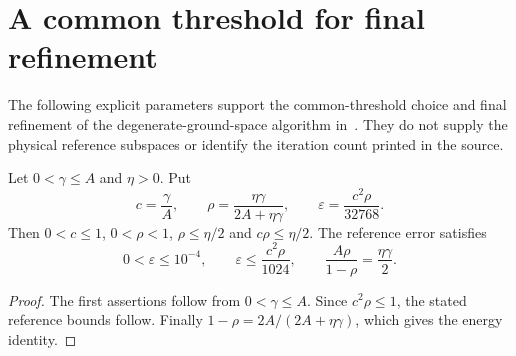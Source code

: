 \section{A common threshold for final refinement}
\label{sec:viable_refinement_parameters}

The following explicit parameters support the common-threshold choice and
final refinement of the degenerate-ground-space algorithm
in~\cite{Arad2016RigorousRG}.
They do not supply the physical reference subspaces or identify the
iteration count printed in the source.

\begin{lemma}
    \label{lem:viable_refinement_error_parameters}
    \leanok
    Let $0<\gamma\le A$ and $\eta>0$. Put
    \[
        c=\frac\gamma A,\qquad
        \rho=\frac{\eta\gamma}{2A+\eta\gamma},\qquad
        \varepsilon=\frac{c^2\rho}{32768}.
    \]
    Then $0<c\le1$, $0<\rho<1$, $\rho\le\eta/2$ and
    $c\rho\le\eta/2$. The reference error satisfies
    \[
        0<\varepsilon\le10^{-4},\qquad
        \varepsilon\le\frac{c^2\rho}{1024},\qquad
        \frac{A\rho}{1-\rho}=\frac{\eta\gamma}{2}.
    \]
\end{lemma}
\begin{proof}\leanok
    The first assertions follow from $0<\gamma\le A$.
    Since $c^2\rho\le1$, the stated reference bounds follow.
    Finally $1-\rho=2A/(2A+\eta\gamma)$, which gives the energy identity.
\end{proof}

